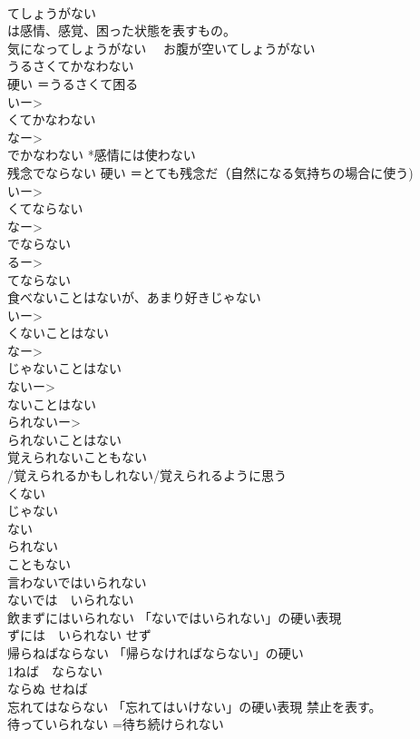 \documentclass[8pt]{extreport}
\begin{document}
\begin{CJK}{UTF8}{min}
\\	てしょうがない
\\	は感情、感覚、困った状態を表すもの。 
\\	気になってしょうがない 　お腹が空いてしょうがない
\\	うるさくてかなわない	
\\	硬い ＝うるさくて困る 
\\	いー>
\\	くてかなわない 
\\	なー>
\\	でかなわない *感情には使わない
\\	残念でならない	硬い ＝とても残念だ（自然になる気持ちの場合に使う) 
\\	いー>
\\	くてならない 
\\	なー>
\\	でならない 
\\	るー>
\\	てならない
\\	食べないことはないが、あまり好きじゃない	
\\	いー>
\\	くないことはない 
\\	なー>
\\	じゃないことはない 
\\	ないー>
\\	ないことはない 
\\	られないー>
\\	られないことはない
\\	覚えられないこともない	
\\	/覚えられるかもしれない/覚えられるように思う
\\	くない 
\\	じゃない 
\\	ない 
\\	られない 
\\	こともない
\\	言わないではいられない	
\\	ないでは　いられない
\\	飲まずにはいられない	「ないではいられない」の硬い表現 
\\	ずには　いられない せず
\\	帰らねばならない	「帰らなければならない」の硬い 
\\	1ねば　ならない　
\\	ならぬ せねば
\\	忘れてはならない	「忘れてはいけない」の硬い表現 禁止を表す。
\\	待っていられない	=待ち続けられない 

\end{CJK}
\end{document}
